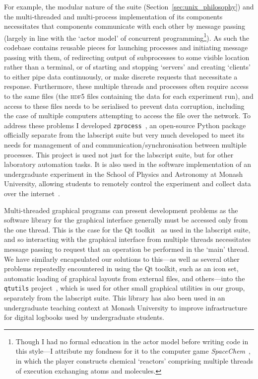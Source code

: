 For example, the modular nature of the suite (Section~\ref{sec:unix_philosophy}) and the multi-threaded and multi-process implementation of its components necessitates that components communicate with each other by message passing (largely in line with the `actor model' of concurrent programming\footnote{Though I had no formal education in the actor model before writing code in this style---I attribute my fondness for it to the computer game \emph{SpaceChem}~\cite{zachtronics_industries_spacechem_2011}, in which the player constructs chemical `reactors' comprising multiple threads of execution exchanging atoms and molecules.}). As such the codebase contains reusable pieces for launching processes and initiating message passing with them, of redirecting output of subprocesses to some visible location rather than a terminal, or of starting and stopping `servers' and creating `clients' to either pipe data continuously, or make discrete requests that necessitate a response. Furthermore, these multiple threads and processes often require access to the same files (the \textsc{hdf5} files containing the data for each experiment run), and access to these files needs to be serialised to prevent data corruption, including the case of multiple computers attempting to access the file over the network. To address these problems I developed \texttt{zprocess}~\cite{billington_zprocess_2018}, an open-source Python package officially separate from the labscript suite but very much developed to meet its needs for management of and communication/synchronisation between multiple processes. This project is used not just for the labscript suite, but for other laboratory automation tasks. It is also used in the software implementation of an undergraduate experiment in the School of Physics and Astronomy at Monash University, allowing students to remotely control the experiment and collect data over the internet~\cite{monash_university_school_of_physics_and_astronomy_measurement_2016}.

Multi-threaded graphical programs can present development problems as the software library for the graphical interface generally must be accessed only from the one thread. This is the case for the Qt toolkit~\cite{the_qt_company_qt_2018} as used in the labscript suite, and so interacting with the graphical interface from multiple threads necessitates message passing to request that an operation be performed in the `main' thread. We have similarly encapsulated our solutions to this---as well as several other problems repeatedly encountered in using the Qt toolkit, such as an icon set, automatic loading of graphical layouts from external files, and others---into the \texttt{qtutils} project~\cite{starkey_qtutils_2018}, which is used for other small graphical utilities in our group, separately from the labscript suite. This library has also been used in an undergraduate teaching context at Monash University to improve infrastructure for digital logbooks used by undergraduate students.

